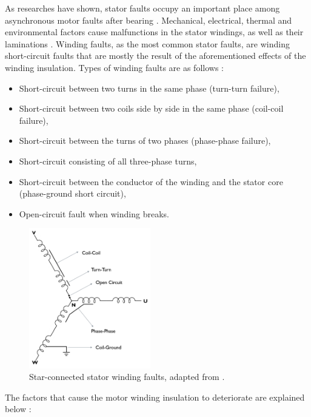 As researches have shown, stator faults occupy an important place among asynchronous motor faults after bearing \cite{motor1985report,albrecht1986assessment,albrecht1987assessment,thorsen1995survey,bonnett2008increased}. Mechanical, electrical, thermal and environmental factors cause malfunctions in the stator windings, as well as their laminations \cite{karmakar2016induction,Siddique}. Winding faults, as the most common stator faults, are winding short-circuit faults that are mostly the result of the aforementioned effects of the winding insulation. Types of winding faults are as follows \cite{karmakar2016induction,Siddique,lipo}:

\begin{itemize}
	\item Short-circuit between two turns in the same phase (turn-turn failure),
	\item Short-circuit between two coils side by side in the same phase (coil-coil failure),
	\item Short-circuit between the turns of two phases (phase-phase failure),
	\item Short-circuit consisting of all three-phase turns,
	\item Short-circuit between the conductor of the winding and the stator core (phase-ground short circuit),
	\item Open-circuit fault when winding breaks.
\end{itemize}

\begin{figure}[h]
	\centering
	\includegraphics[width=150pt,keepaspectratio=true]{./fig/stator.PNG}
	\caption{Star-connected stator winding faults, adapted from \cite{karmakar2016induction}.}	
	\label{statorwinding}
\end{figure}

The factors that cause the motor winding insulation to deteriorate are explained below \cite{bonnett1999root,karmakar2016induction,Siddique,faiz2017fault}:

